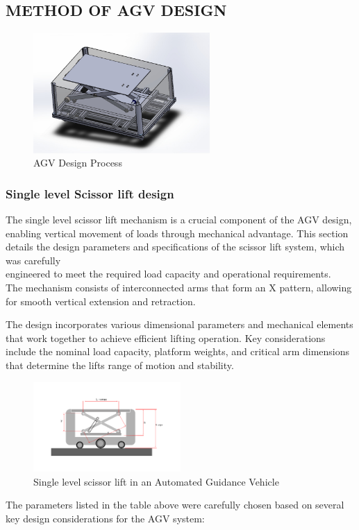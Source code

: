 \documentclass[../../main]{subfiles}
\begin{document}
\subsection{METHOD OF AGV DESIGN}
\begin{figure}[ht]
  \centering
  \includegraphics[width=0.6\textwidth]{img/image1.jpg}
  \caption{AGV Design Process}
\end{figure}

\subsubsection{Single level Scissor lift design}

The single level scissor lift mechanism is a crucial component of the
AGV design,\\ enabling vertical movement of loads through mechanical
advantage. This section details the design parameters and specifications
of the scissor lift system, which was carefully\\ engineered to meet the
required load capacity and operational requirements.\\The mechanism
consists of interconnected arms that form an
\textquotesingle X\textquotesingle{} pattern, allowing for smooth
vertical extension and retraction.

The design incorporates various dimensional parameters and mechanical
elements that work together to achieve efficient lifting operation. Key
considerations include the nominal load capacity, platform weights, and
critical arm dimensions that determine the lift\textquotesingle s range
of motion and stability.

\begin{figure}[h]
\centering
\includegraphics[width=0.5\textwidth]{img/image003.png}
\caption{Single level scissor lift in an Automated Guidance Vehicle}
\end{figure}
\newpage
The parameters listed in the table above were carefully chosen based on
several key design considerations for the AGV system:
\end{document}
